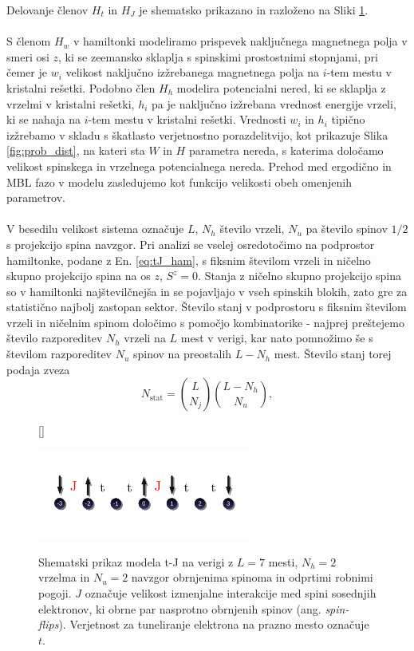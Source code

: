 Delovanje členov $H_t$ in $H_J$ je shematsko prikazano in razloženo na Sliki \ref{fig:tJ_scheme}. \\\\
S členom $H_w$ v hamiltonki modeliramo prispevek naključnega magnetnega polja v smeri osi $z$, ki se zeemansko sklaplja s 
spinskimi prostostnimi stopnjami, pri čemer je $w_i$ velikost naključno izžrebanega magnetnega polja na $i$-tem mestu v kristalni rešetki. Podobno člen $H_h$ modelira potencialni nered, ki se sklaplja z vrzelmi v kristalni rešetki, $h_i$ pa je naključno izžrebana vrednost energije vrzeli, ki se nahaja na $i$-tem mestu v kristalni rešetki. Vrednosti $w_i$ in $h_i$ tipično izžrebamo v skladu s škatlasto verjetnostno porazdelitvijo, kot prikazuje Slika \ref{fig:prob_dist}, na kateri sta $W$ in $H$	 parametra 
nereda, s katerima določamo velikost spinskega in vrzelnega potencialnega nereda. Prehod med ergodično in MBL fazo
v modelu zasledujemo kot funkcijo velikosti obeh omenjenih parametrov.\\\\
V besedilu velikost sistema označuje $L$, $N_h$ število vrzeli, $N_u$ pa število spinov $1/2$ s projekcijo spina navzgor. Pri analizi se vselej osredotočimo na podprostor hamiltonke, podane z En. \eqref{eq:tJ_ham}, s fiksnim številom vrzeli in ničelno skupno projekcijo spina na os $z$, $S^z=0$. Stanja z ničelno skupno projekcijo spina so v hamiltonki najštevilčnejša in se pojavljajo v vseh spinskih blokih, zato gre za statistično najbolj zastopan sektor. Število stanj v podprostoru s fiksnim številom vrzeli in ničelnim spinom določimo s pomočjo kombinatorike - najprej prešteje{}mo število razporeditev $N_h$ vrzeli na $L$ mest v verigi, kar nato pomnožimo še s številom razporeditev $N_u$ spinov na preostalih $L-N_h$ mest. Število stanj torej podaja zveza
\begin{equation}\label{eq:nstat}
N_\mathrm{stat}=\binom{L}{N_j}\binom{L-N_h}{N_u},
\end{equation}
\begin{figure}[H]
[\FBwidth]
{\caption{Shematski prikaz modela t-J na verigi z $L=7$ mesti, $N_h=2$ vrzelma in $N_u=2$ navzgor obrnjenima spinoma in odprtimi robnimi pogoji.	 $J$ označuje velikost izmenjalne interakcije med spini sosednjih elektronov, ki obrne par nasprotno obrnjenih spinov (ang. \emph{spin-flips}). Verjetnost za tuneliranje elektrona na prazno mesto označuje $t$. }\label{fig:tJ_scheme}}
{\includegraphics[width=0.62\textwidth]{tJ_scheme.pdf}}
\end{figure}
